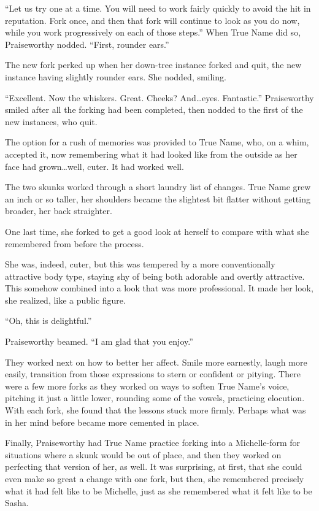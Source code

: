 ``Let us try one at a time. You will need to work fairly quickly to avoid the hit in reputation. Fork once, and then that fork will continue to look as you do now, while you work progressively on each of those steps.'' When True Name did so, Praiseworthy nodded. ``First, rounder ears.''

The new fork perked up when her down-tree instance forked and quit, the new instance having slightly rounder ears. She nodded, smiling.

``Excellent. Now the whiskers. Great. Cheeks? And\ldots eyes. Fantastic.'' Praiseworthy smiled after all the forking had been completed, then nodded to the first of the new instances, who quit.

The option for a rush of memories was provided to True Name, who, on a whim, accepted it, now remembering what it had looked like from the outside as her face had grown\ldots well, cuter. It had worked well.

The two skunks worked through a short laundry list of changes. True Name grew an inch or so taller, her shoulders became the slightest bit flatter without getting broader, her back straighter.

One last time, she forked to get a good look at herself to compare with what she remembered from before the process.

She was, indeed, cuter, but this was tempered by a more conventionally attractive body type, staying shy of being both adorable and overtly attractive. This somehow combined into a look that was more professional. It made her look, she realized, like a public figure.

``Oh, this is delightful.''

Praiseworthy beamed. ``I am glad that you enjoy.''

They worked next on how to better her affect. Smile more earnestly, laugh more easily, transition from those expressions to stern or confident or pitying. There were a few more forks as they worked on ways to soften True Name's voice, pitching it just a little lower, rounding some of the vowels, practicing elocution. With each fork, she found that the lessons stuck more firmly. Perhaps what was in her mind before became more cemented in place.

Finally, Praiseworthy had True Name practice forking into a Michelle-form for situations where a skunk would be out of place, and then they worked on perfecting that version of her, as well. It was surprising, at first, that she could even make so great a change with one fork, but then, she remembered precisely what it had felt like to be Michelle, just as she remembered what it felt like to be Sasha.

